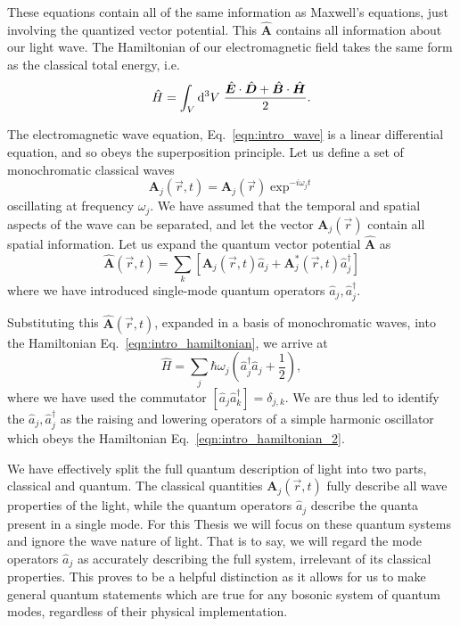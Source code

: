 \noindent These equations contain all of the same information as Maxwell's equations, just involving the quantized vector potential. This $\hat{\bm{A}}$ contains all information about our light wave. The Hamiltonian of our electromagnetic field takes the same form as the classical total energy, i.e.
\begin{equation}\label{eqn:intro_hamiltonian}
\hat{H} = \int_V \mathop{}\!\mathrm{d^3} V \; \frac{\hat{\bm{E}} \cdot \hat{\bm{D}} + \hat{\bm{B}} \cdot \hat{\bm{H}}}{2}.
\end{equation}


\noindent The electromagnetic wave equation, Eq.~\ref{eqn:intro_wave} is a linear differential equation, and so obeys the superposition principle. Let us define a set of monochromatic classical waves
\begin{equation}
\bm{A}_j\left(\overrightarrow{r}, t\right) = \bm{A}_j\left(\overrightarrow{r}\right) \exp^{-i \omega_j t}
\end{equation}
oscillating at frequency $\omega_j$. We have assumed that the temporal and spatial aspects of the wave can be separated, and let the vector $\bm{A}_j\left(\overrightarrow{r}\right)$ contain all spatial information. %
Let us expand the quantum vector potential $\hat{\bm{A}}$ as
\begin{equation}
\hat{\bm{A}}\left(\overrightarrow{r}, t\right) = \sum_k \left[ \bm{A}_j\left(\overrightarrow{r}, t\right) \hat{a}_j + \bm{A}_j^* \left(\overrightarrow{r}, t\right) \hat{a}_j^\dagger\right]
\end{equation}
where we have introduced single-mode quantum operators $\hat{a}_j, \hat{a}_j^\dagger$.

Substituting this $\hat{\bm{A}}\left(\overrightarrow{r}, t\right)$, expanded in a basis of monochromatic waves, into the Hamiltonian Eq.~\ref{eqn:intro_hamiltonian}, we arrive at
\begin{equation}\label{eqn:intro_hamiltonian_2}
\hat{H} = \sum_j \hbar \omega_j \left( \hat{a}_j^\dagger \hat{a}_j + \frac{1}{2}\right),
\end{equation}
where we have used the commutator $\left[ \hat{a}_j \hat{a}_k^\dagger \right] = \delta_{j, k}$. We are thus led to identify the $\hat{a}_j, \hat{a}_j^\dagger$ as the raising and lowering operators of a simple harmonic oscillator which obeys the Hamiltonian Eq.~\ref{eqn:intro_hamiltonian_2}. 

We have effectively split the full quantum description of light into two parts, classical and quantum. The classical quantities $\bm{A}_j\left(\overrightarrow{r}, t\right)$ fully describe all wave properties of the light, while the quantum operators $\hat{a}_j$ describe the quanta present in a single mode. For this Thesis we will focus on these quantum systems and ignore the wave nature of light. That is to say, we will regard the mode operators $\hat{a}_j$ as accurately describing the full system, irrelevant of its classical properties. This proves to be a helpful distinction as it allows for us to make general quantum statements which are true for any bosonic system of quantum modes, regardless of their physical implementation.


